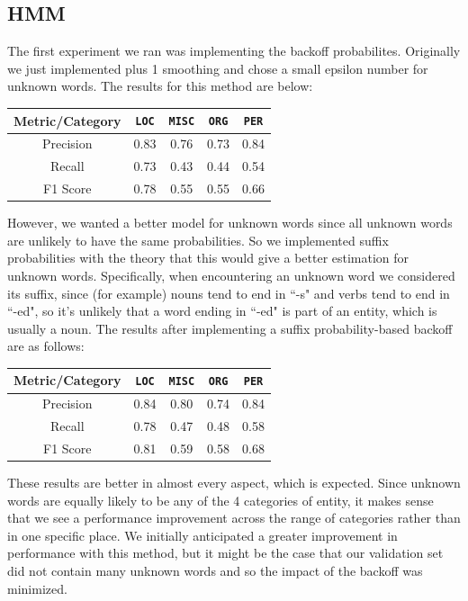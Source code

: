 \documentclass[12pt]{article}
\begin{document}
\subsection{HMM}
The first experiment we ran was implementing the backoff probabilites. Originally we just implemented plus 1 smoothing and chose a small epsilon number for unknown words. The results for this method are below:
\begin{center}
	\begin{tabular}{|c|c|c|c|c|}
		\hline
		\textbf{Metric/Category} & {\tt LOC} & {\tt MISC} & {\tt ORG} & {\tt PER}\\
		\hline
		Precision & 0.83 & 0.76 & 0.73 & 0.84 \\
		\hline
		Recall & 0.73 & 0.43 & 0.44 & 0.54 \\
		\hline
		F1 Score & 0.78 & 0.55 & 0.55 & 0.66\\
		\hline
	\end{tabular}
\end{center}
However, we wanted a better model for unknown words since all unknown words are unlikely to have the same probabilities. So we implemented suffix probabilities with the theory that this would give a better estimation for unknown words. Specifically, when encountering an unknown word we considered its suffix, since (for example) nouns tend to end in ``-s" and verbs tend to end in ``-ed", so it's unlikely that a word ending in ``-ed" is part of an entity, which is usually a noun. The results after implementing a suffix probability-based backoff are as follows:
\begin{center}
	\begin{tabular}{|c|c|c|c|c|}
		\hline
		\textbf{Metric/Category} & {\tt LOC} & {\tt MISC} & {\tt ORG} & {\tt PER}\\
		\hline
		Precision & 0.84 & 0.80 & 0.74 & 0.84\\
		\hline
		Recall & 0.78 & 0.47 & 0.48 & 0.58\\
		\hline
		F1 Score & 0.81 & 0.59 & 0.58 & 0.68\\
		\hline
	\end{tabular}
\end{center}
These results are better in almost every aspect, which is expected. Since unknown words are equally likely to be any of the 4 categories of entity, it makes sense that we see a performance improvement across the range of categories rather than in one specific place. We initially anticipated a greater improvement in performance with this method, but it might be the case that our validation set did not contain many unknown words and so the impact of the backoff was minimized.   
\end{document}
